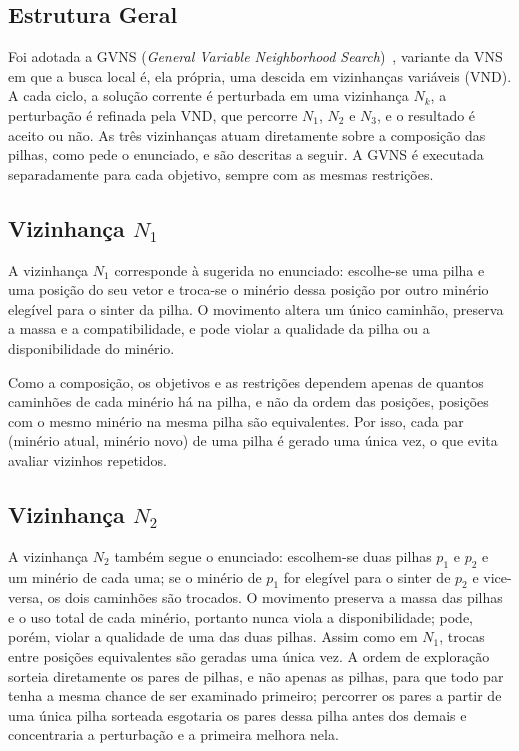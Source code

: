 \documentclass[conference]{IEEEtran}
\begin{document}
\subsection{Estrutura Geral}

Foi adotada a GVNS (\textit{General Variable Neighborhood Search})~\cite{aula02}, variante da VNS em que a busca local é, ela própria, uma descida em vizinhanças variáveis (VND). A cada ciclo, a solução corrente é perturbada em uma vizinhança $N_k$, a perturbação é refinada pela VND, que percorre $N_1$, $N_2$ e $N_3$, e o resultado é aceito ou não. As três vizinhanças atuam diretamente sobre a composição das pilhas, como pede o enunciado, e são descritas a seguir. A GVNS é executada separadamente para cada objetivo, sempre com as mesmas restrições.

\subsection{Vizinhança $N_1$}

A vizinhança $N_1$ corresponde à sugerida no enunciado: escolhe-se uma pilha e uma posição do seu vetor e troca-se o minério dessa posição por outro minério elegível para o sinter da pilha. O movimento altera um único caminhão, preserva a massa e a compatibilidade, e pode violar a qualidade da pilha ou a disponibilidade do minério.

Como a composição, os objetivos e as restrições dependem apenas de quantos caminhões de cada minério há na pilha, e não da ordem das posições, posições com o mesmo minério na mesma pilha são equivalentes. Por isso, cada par (minério atual, minério novo) de uma pilha é gerado uma única vez, o que evita avaliar vizinhos repetidos.

\subsection{Vizinhança $N_2$}

A vizinhança $N_2$ também segue o enunciado: escolhem-se duas pilhas $p_1$ e $p_2$ e um minério de cada uma; se o minério de $p_1$ for elegível para o sinter de $p_2$ e vice-versa, os dois caminhões são trocados. O movimento preserva a massa das pilhas e o uso total de cada minério, portanto nunca viola a disponibilidade; pode, porém, violar a qualidade de uma das duas pilhas. Assim como em $N_1$, trocas entre posições equivalentes são geradas uma única vez. A ordem de exploração sorteia diretamente os pares de pilhas, e não apenas as pilhas, para que todo par tenha a mesma chance de ser examinado primeiro; percorrer os pares a partir de uma única pilha sorteada esgotaria os pares dessa pilha antes dos demais e concentraria a perturbação e a primeira melhora nela.
\end{document}
